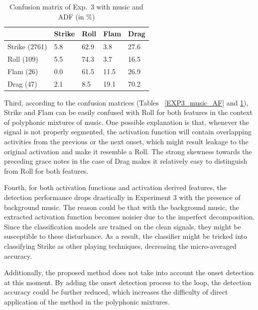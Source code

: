 \documentclass{article}
\begin{document}
\begin{table}[]
\centering
\begin{tabular}{l|llll}
      & Strike & Roll & Flam & Drag \\ \hline
Strike (2761) & 5.8    & 62.9 & 3.8  & 27.6 \\
Roll (109)  & 5.5    & 74.3 & 3.7  & 16.5 \\
Flam (26)  & 0.0    & 61.5 & 11.5 & 26.9 \\
Drag (47)  & 2.1    & 8.5  & 19.1 & 70.2
\end{tabular}
\caption{Confusion matrix of Exp.~3 with music and ADF (in \%)}
\label{EXP3_music_ADF}
\end{table}

Third, according to the confusion matrices (Tables~ \ref{EXP3_music_AF} and \ref{EXP3_music_ADF}), Strike and Flam can be easily confused with Roll for both features in the context of polyphonic mixtures of music. One possible explanation is that, whenever the signal is not properly segmented, the activation function will contain overlapping activities from the previous or the next onset, which might result leakage to the original activation and make it resemble a Roll. The strong skewness towards the preceding grace notes in the case of Drag makes it relatively easy to distinguish from Roll for both features.  

Fourth, for both activation functions and activation derived features, the detection performance drops drastically in Experiment 3 with the presence of background music. The reason could be that with the background music, the extracted activation function becomes noisier due to the imperfect decomposition. Since the classification models are trained on the clean signals, they might be susceptible to these disturbance. As a result, the classifier might be tricked into classifying Strike as other playing techniques, decreasing the micro-averaged accuracy. 

Additionally, the proposed method does not take into account the onset detection at this moment. By adding the onset detection process to the loop, the detection accuracy could be further reduced, which increases the difficulty of direct application of the method in the polyphonic mixtures. 
\end{document}
